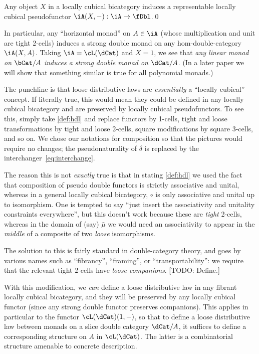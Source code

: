 \documentclass{amsart}
\let\oc\circ
\newcommand{\Smult}{\mu}
\newcommand{\dl}{\delta}
\newcommand{\Sdlmult}{\bar\Smult}%
\begin{document}
\begin{thm}
  Any object $X$ in a locally cubical bicategory \iA induces a representable locally cubical pseudofunctor $\iA(X,-):\iA \to \fDbl$.\qed
\end{thm}

In particular, any ``horizontal monad'' on $A\in \iA$ (whose multiplication and unit are tight 2-cells) induces a strong double monad on any hom-double-category $\iA(X,A)$.
Taking $\iA=\cL(\dCat)$ and $X=1$, we see that \emph{any linear monad on $\bCat/A$ induces a strong double monad on $\dCat/A$}.
(In a later paper we will show that something similar is true for all polynomial monads.)

The punchline is that loose distributive laws are \emph{essentially} a ``locally cubical'' concept.
If literally true, this would mean they could be defined in any locally cubical bicategory and are preserved by locally cubical pseudofunctors.
To see this, simply take \cref{def:hdl} and replace functors by 1-cells, tight and loose transformations by tight and loose 2-cells, square modifications by square 3-cells, and so on.
We chose our notations for composition so that the pictures would require no changes; the pseudonaturality of $\dl$ is replaced by the interchanger~\eqref{eq:interchange}.

The reason this is not \emph{exactly} true is that in stating \cref{def:hdl} we used the fact that composition of pseudo double functors is strictly associative and unital, whereas in a general locally cubical bicategory, $\oc$ is only associative and unital up to isomorphism.
One is tempted to say ``just insert the associativity and unitality constraints everywhere'', but this doesn't work because these are \emph{tight} 2-cells, whereas in the domain of (say) $\Sdlmult$ we would need an associativity to appear in the \emph{middle} of a composite of two \emph{loose} isomorphisms.

The solution to this is fairly standard in double-category theory, and goes by various names such as ``fibrancy'', ``framing'', or ``transportability'': we require that the relevant tight 2-cells have \emph{loose companions}.
[TODO: Define.]

With this modification, we \emph{can} define a loose distributive law in any fibrant locally cubical bicategory, and they will be preserved by any locally cubical functor (since any strong double functor preserves companions).
This applies in particular to the functor $\cL(\dCat)(1,-)$, so that to define a loose distributive law between monads on a slice double category $\dCat/A$, it suffices to define a corresponding structure on $A$ in $\cL(\dCat)$.
The latter is a combinatorial structure amenable to concrete description.
\end{document}
